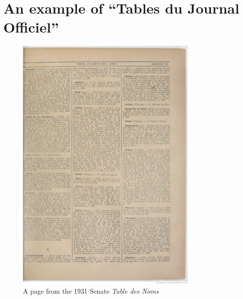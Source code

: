 \section{An example of ``Tables du Journal Officiel''}
\begin{figure}[htbp]
    \centering
    \includegraphics[width=0.8\textwidth]{img/jo_entire.jpeg}
    \caption{A page from the 1931 Senate \textit{Table des Noms}}
    \label{fig:jo}
\end{figure}
